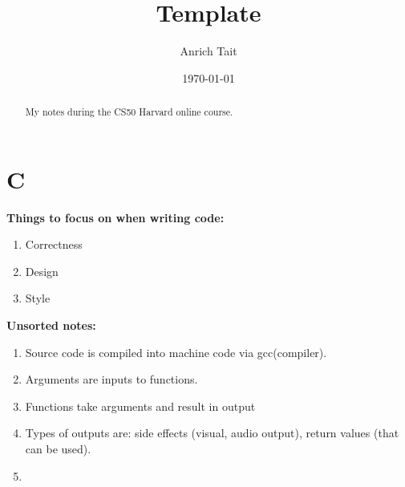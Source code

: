 \documentclass[12pt, letterpaper]{report}
\title{Template}
\author{Anrich Tait}
\date{\today}
\begin{document}
\restoregeometry %
\nopagecolor%

\tableofcontents
\begin{abstract}
My notes during the CS50 Harvard online course.
\end{abstract}

\chapter{C}
\textbf{Things to focus on when writing code:}
\begin{enumerate}
	\item Correctness
	\item Design
	\item Style
\end{enumerate}


\textbf{Unsorted notes:}
\begin{enumerate}
	\item Source code is compiled into machine code via gcc(compiler).
	\item Arguments are inputs to functions.
	\item Functions take arguments and result in output
	\item Types of outputs are: side effects (visual, audio output), return values (that can be used).
	\item 
\end{enumerate}
\end{document}
